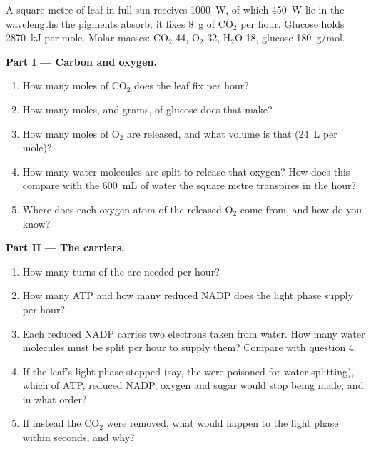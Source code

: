 \begin{problem}
\label{pb:g12:photosynthesis:1}
A square metre of leaf in full sun receives \qty{1000}{W}, of which
\qty{450}{W} lie in the wavelengths the pigments absorb; it fixes
\qty{8}{g} of $\mathrm{CO_2}$ per hour. Glucose holds \qty{2870}{kJ}
per mole. Molar masses: $\mathrm{CO_2}$ 44, $\mathrm{O_2}$ 32,
$\mathrm{H_2O}$ 18, glucose \qty{180}{g/mol}.

\medskip
\noindent\textbf{Part I --- Carbon and oxygen.}
\begin{enumerate}
  \item How many moles of $\mathrm{CO_2}$ does the leaf fix per hour?
  \item How many moles, and grams, of glucose does that make?
  \item How many moles of $\mathrm{O_2}$ are released, and what volume
        is that (\qty{24}{L} per mole)?
  \item How many water molecules are split to release that oxygen?
        How does this compare with the \qty{600}{mL} of water the
        square metre transpires in the hour?
  \item Where does each oxygen atom of the released $\mathrm{O_2}$ come
        from, and how do you know?
\end{enumerate}

\medskip
\noindent\textbf{Part II --- The carriers.}
\begin{enumerate}[resume]
  \item How many turns of the  are needed per hour?
  \item How many ATP and how many reduced NADP does the light phase
        supply per hour?
  \item Each reduced NADP carries two electrons taken from water. How
        many water molecules must be split per hour to supply them?
        Compare with question 4.
  \item If the leaf's light phase stopped (say, the  were
        poisoned for water splitting), which of ATP, reduced NADP,
        oxygen and sugar would stop being made, and in what order?
  \item If instead the $\mathrm{CO_2}$ were removed, what would happen
        to the light phase within seconds, and why?
\end{enumerate}


\end{problem}
